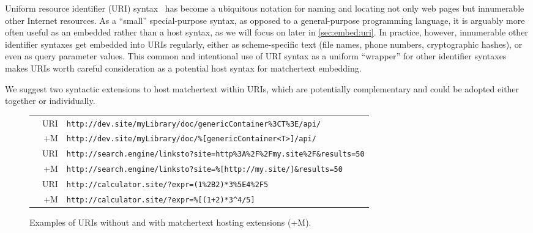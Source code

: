 Uniform resource identifier (URI) syntax~\cite{rfc3986}
has become a ubiquitous notation for naming and locating
not only web pages but innumerable other Internet resources.
As a ``small'' special-purpose syntax,
as opposed to a general-purpose programming language,
it is arguably more often useful as an embedded rather than a host syntax,
as we will focus on later in \cref{sec:embed:uri}.
In practice, however, innumerable other identifier syntaxes
get embedded into URIs regularly,
either as scheme-specific text
(\eg file names, phone numbers, cryptographic hashes),
or even as query parameter values.
This common and intentional use of URI syntax
as a uniform ``wrapper'' for other identifier syntaxes
makes URIs worth careful consideration as a potential host syntax
for matchertext embedding.

We suggest two syntactic extensions
to host matchertext within URIs,
which are potentially complementary
and could be adopted either together or individually.

\begin{figure*}
\begin{center}
\begin{footnotesize}
\begin{tabular}{lrl}
& URI	& \verb|http://dev.site/myLibrary/doc/genericContainer%3CT%3E/api/| \\
& +M	& \verb|http://dev.site/myLibrary/doc/%[genericContainer<T>]/api/| \\
& URI	& \verb|http://search.engine/linksto?site=http%3A%2F%2Fmy.site%2F&results=50| \\
& +M	& \verb|http://search.engine/linksto?site=%[http://my.site/]&results=50| \\
& URI	& \verb|http://calculator.site/?expr=(1%2B2)*3%5E4%2F5| \\
& +M	& \verb|http://calculator.site/?expr=%[(1+2)*3^4/5]| \\
\end{tabular}
\end{footnotesize}
\end{center}
\caption{Examples of URIs without and with matchertext hosting extensions (+M).}
\label{fig:host:uri-examples}
\end{figure*}

